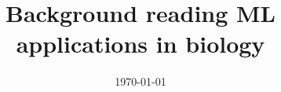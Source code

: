 \documentclass[letterpaper,11pt,reqno]{amsart}
\begin{document}
\title{Background reading ML applications in biology}
\date{\today}
\maketitle

\nocite{*}


\end{document}
